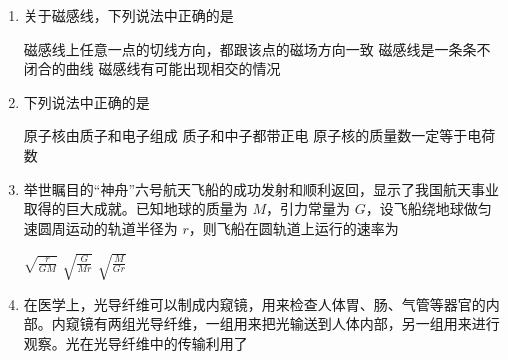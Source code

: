 \documentclass[\gkver]{gaokaozhenti}
\begin{document}
\begin{enumerate}

{$F_{1}$ 一定小于 $F_{2}$}
{$F_{1}$ 与 $F_{2}$ 大小一定相等}
{无法比较 $F_{1}$ 与 $F_{2}$ 的大小}


\item
关于磁感线，下列说法中正确的是

{磁感线上任意一点的切线方向，都跟该点的磁场方向一致}
{磁感线是一条条不闭合的曲线}
{磁感线有可能出现相交的情况}


\item
下列说法中正确的是

{原子核由质子和电子组成}
{质子和中子都带正电}
{原子核的质量数一定等于电荷数}


\item
举世瞩目的“神舟”六号航天飞船的成功发射和顺利返回，显示了我国航天事业取得的巨大成就。已知地球的质量为 $M$，引力常量为 $G$，设飞船绕地球做匀速圆周运动的轨道半径为 $r$，则飞船在圆轨道上运行的速率为

{$\sqrt{\frac{r}{GM}}$}
{$\sqrt{\frac{G}{Mr}}$}
{$\sqrt{\frac{M}{Gr}}$}


\item
在医学上，光导纤维可以制成内窥镜，用来检查人体胃、肠、气管等器官的内部。内窥镜有两组光导纤维，一组用来把光输送到人体内部，另一组用来进行观察。光在光导纤维中的传输利用了


\end{enumerate}
\end{document}
